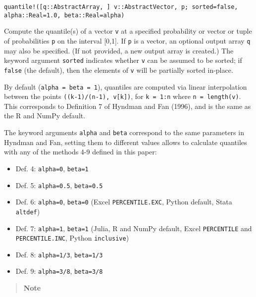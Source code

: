 \begin{adjustwidth}{2em}{0pt}


\begin{verbatim}
quantile!([q::AbstractArray, ] v::AbstractVector, p; sorted=false, alpha::Real=1.0, beta::Real=alpha)
\end{verbatim}

Compute the quantile(s) of a vector \texttt{v} at a specified probability or vector or tuple of probabilities \texttt{p} on the interval [0,1]. If \texttt{p} is a vector, an optional output array \texttt{q} may also be specified. (If not provided, a new output array is created.) The keyword argument \texttt{sorted} indicates whether \texttt{v} can be assumed to be sorted; if \texttt{false} (the default), then the elements of \texttt{v} will be partially sorted in-place.

By default (\texttt{alpha = beta = 1}), quantiles are computed via linear interpolation between the points \texttt{((k-1)/(n-1), v[k])}, for \texttt{k = 1:n} where \texttt{n = length(v)}. This corresponds to Definition 7 of Hyndman and Fan (1996), and is the same as the R and NumPy default.

The keyword arguments \texttt{alpha} and \texttt{beta} correspond to the same parameters in Hyndman and Fan, setting them to different values allows to calculate quantiles with any of the methods 4-9 defined in this paper:

\begin{itemize}
\item Def. 4: \texttt{alpha=0}, \texttt{beta=1}


\item Def. 5: \texttt{alpha=0.5}, \texttt{beta=0.5}


\item Def. 6: \texttt{alpha=0}, \texttt{beta=0} (Excel \texttt{PERCENTILE.EXC}, Python default, Stata \texttt{altdef})


\item Def. 7: \texttt{alpha=1}, \texttt{beta=1} (Julia, R and NumPy default, Excel \texttt{PERCENTILE} and \texttt{PERCENTILE.INC}, Python \texttt{{\textquotesingle}inclusive{\textquotesingle}})


\item Def. 8: \texttt{alpha=1/3}, \texttt{beta=1/3}


\item Def. 9: \texttt{alpha=3/8}, \texttt{beta=3/8}

\end{itemize}
\begin{quote}
\textbf{Note}


\end{quote}
\end{adjustwidth}
